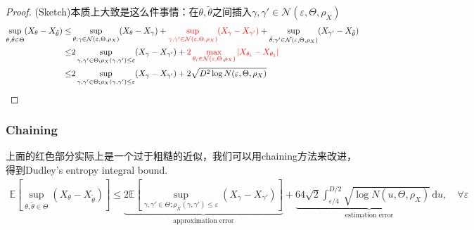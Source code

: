 \documentclass[11pt,a4paper]{ctexart}
\numberwithin{equation}{section}%
\begin{document}
\begin{proof}
    (Sketch)本质上大致是这么件事情：在$ \theta ,\tilde{\theta } $之间插入$ \gamma ,\gamma '\in \mathcal{N}(\varepsilon ,\Theta, \rho _X) $
    \begin{align*}
        \mathop{ \sup  }\limits_{\theta ,\tilde{\theta }\in \Theta} (X_\theta -X_{\tilde{\theta }}) \leq & \mathop{ \sup  }\limits_{\theta; \gamma \in \mathcal{N}(\varepsilon ,\Theta, \rho _X) } (X_\theta -X_{\gamma }) +{\color{red} \mathop{ \sup  }\limits_{\gamma ,\gamma '\in \mathcal{N}(\varepsilon ,\Theta, \rho _X) } (X_\gamma -X_{\gamma '})} + \mathop{ \sup  }\limits_{\tilde{\theta }; \gamma '\in \mathcal{N}(\varepsilon ,\Theta, \rho _X) } (X_{\gamma '} -X_{\tilde{\theta }}) \\
        \leq & 2 \mathop{ \sup  }\limits_{\gamma ,\gamma '\in \Theta; \rho _X(\gamma ,\gamma ')\leq \varepsilon } (X_\gamma - X_{\gamma '} ) +{\color{red} 2 \mathop{ \max  }\limits_{\theta _i \in \mathcal{N}(\varepsilon ,\Theta, \rho _X) } \left\vert X_{\theta _i}- X_{\theta _1} \right\vert } \\
        \leq& 2 \mathop{ \sup  }\limits_{\gamma ,\gamma '\in \Theta; \rho _X(\gamma ,\gamma ')\leq \varepsilon } (X_\gamma - X_{\gamma '} ) + 2\sqrt{ D^2\log N(\varepsilon , \Theta, \rho _X) }
    \end{align*}
\end{proof}




\subsubsection{Chaining}
上面的红色部分实际上是一个过于粗糙的近似，我们可以用chaining方法来改进，得到Dudley's entropy integral bound.
\begin{align*}
    \mathbb{E}\left[ \mathop{ \sup  }\limits_{\theta ,\tilde{\theta }\in \Theta} (X_\theta -X_{\tilde{\theta }})  \right]  \leq \underbrace{2\mathbb{E}\left[ \mathop{ \sup  }\limits_{\gamma ,\gamma '\in \Theta; \rho _X(\gamma ,\gamma ')\leq \varepsilon } (X_\gamma - X_{\gamma '} )  \right] }_\text{approximation error} + \underbrace{ 64\sqrt{2} \int_{\varepsilon /4}^{D/2} \sqrt{\log N(u, \Theta, \rho _X)} \,\mathrm{d}u   }_\text{estimation error},\quad \forall \varepsilon 
\end{align*}
\end{document}
